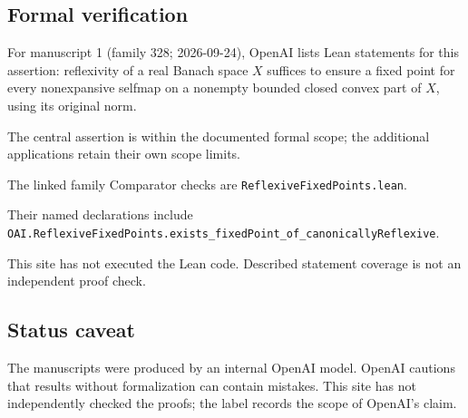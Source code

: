 \documentclass[11pt]{article}
\begin{document}
\subsection{Formal verification}
For manuscript 1 (family 328; 2026-09-24), OpenAI lists Lean statements for this assertion: reflexivity of a real Banach space $X$ suffices to ensure a fixed point for every nonexpansive selfmap on a nonempty bounded closed convex part of $X$, using its original norm.

The central assertion is within the documented formal scope; the additional applications retain their own scope limits.

The linked family Comparator checks are \texttt{ReflexiveFixedPoints.lean}.

Their named declarations include \texttt{OAI.ReflexiveFixedPoints.exists\_fixedPoint\_of\_canonicallyReflexive}.

This site has not executed the Lean code. Described statement coverage is not an independent proof check.

\subsection{Status caveat}
The manuscripts were produced by an internal OpenAI model. OpenAI cautions that results without formalization can contain mistakes. This site has not independently checked the proofs; the label records the scope of OpenAI's claim.
\end{document}

